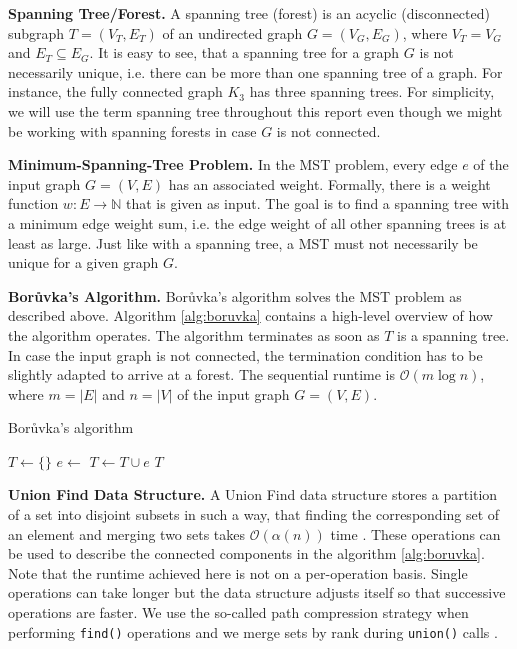 \documentclass[letterpaper]{article}
\newcommand{\N}[0]{\mathbb{N}}
\newcommand{\bigoh}{\mathcal O}
\newcommand{\mypar}[1]{{\bf #1.}}
\begin{document}
\mypar{Spanning Tree/Forest}
A spanning tree (forest) is an acyclic (disconnected) subgraph $T = (V_T, E_T)$ of an undirected graph $G = (V_G, E_G)$,
where $V_T = V_G$ and $E_T \subseteq E_G$. It is easy to see, that a spanning tree for a graph $G$ is not necessarily
unique, i.e. there can be more than one spanning tree of a graph. For instance, the fully connected graph $K_3$ has
three spanning trees. For simplicity, we will use the term spanning tree throughout this report even though we might be
working with spanning forests in case $G$ is not connected.

\mypar{Minimum-Spanning-Tree Problem}
In the MST problem, every edge $e$ of the input graph $G = (V, E)$ has an associated weight. Formally, there is a weight
function $w : E \to \N$ that is given as input. The goal is to find a spanning tree with a minimum edge weight sum, i.e.
the edge weight of all other spanning trees is at least as large. Just like with a spanning tree, a MST must not
necessarily be unique for a given graph $G$.

\mypar{Bor\r{u}vka's Algorithm}
Bor\r{u}vka's algorithm \cite{boruuvka1926jistem, nevsetvril2001otakar} solves the MST problem as described above.
Algorithm \ref{alg:boruvka} contains a high-level overview of how the algorithm operates. The algorithm terminates as
soon as $T$ is a spanning tree. In case the input graph is not connected, the termination condition has to be slightly
adapted to arrive at a forest. The sequential runtime is $\bigoh(m \log n)$, where $m = |E|$ and $n = |V|$ of the input
graph $G = (V, E)$.

\begin{algorithm}[!t]
  \caption{Bor\r{u}vka's algorithm}
  \label{alg:boruvka}
  \begin{algorithmic}
    \State $T \gets \{ \}$
        \State $e \gets$ 
        \State $T \gets T \cup e$
      \EndFor
      \State {}
    \EndWhile
    \State \Return $T$
  \end{algorithmic}
\end{algorithm}

\mypar{Union Find Data Structure}
A Union Find data structure stores a partition of a set into disjoint subsets in such a way, that finding the
corresponding set of an element and merging two sets takes $\bigoh(\alpha(n))$ time \cite{efficiency_union_find}. These
operations can be used to describe the connected components in the algorithm \ref{alg:boruvka}. Note that the runtime
achieved here is not on a per-operation basis. Single operations can take longer but the data structure adjusts itself
so that successive operations are faster.
We use the so-called path compression strategy when performing \verb|find()| operations and we merge sets by rank during
\verb|union()| calls \cite{intro_to_algos}.
\end{document}

